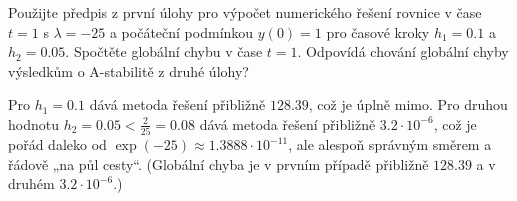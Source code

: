 \documentclass[12pt]{article}                   %
\begin{document}
\begin{priklad}[5.3]
	Použijte předpis z první úlohy pro výpočet numerického řešení rovnice v čase $t = 1$ s $\lambda = -25$ a počáteční podmínkou $y(0) = 1$ pro časové kroky $h_1 = 0.1$ a $h_2 = 0.05$. Spočtěte globální chybu v čase $t = 1$. Odpovídá chování globální chyby výsledkům o A-stabilitě z druhé úlohy?

	\begin{reseni}
		Pro $h_1 = 0.1$ dává metoda řešení přibližně $128.39$, což je úplně mimo. Pro druhou hodnotu $h_2 = 0.05 < \frac{2}{25} = 0.08$ dává metoda řešení přibližně $3.2 · 10^{-6}$, což je pořád daleko od $\exp(-25) \approx 1.3888 · 10^{-11}$, ale alespoň správným směrem a řádově „na půl cesty“. (Globální chyba je v prvním případě přibližně $128.39$ a v druhém $3.2 · 10^{-6}$.)
	\end{reseni}
\end{priklad}
\end{document}
